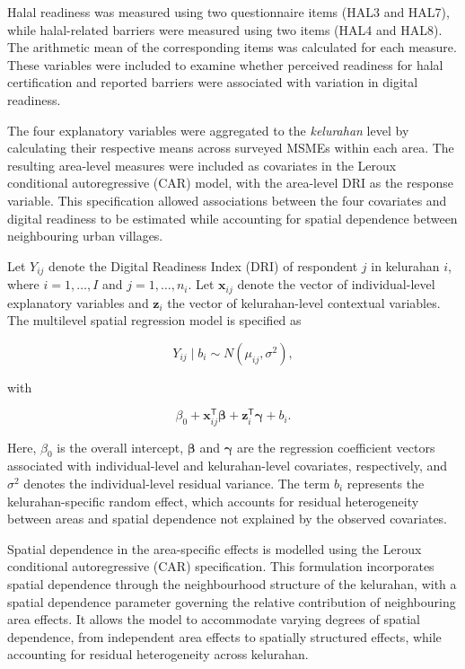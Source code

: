 \documentclass[
  default,
]{sn-jnl}
\begin{document}
Halal readiness was measured using two questionnaire items (HAL3 and
HAL7), while halal-related barriers were measured using two items (HAL4
and HAL8). The arithmetic mean of the corresponding items was calculated
for each measure. These variables were included to examine whether
perceived readiness for halal certification and reported barriers were
associated with variation in digital readiness.

The four explanatory variables were aggregated to the \emph{kelurahan}
level by calculating their respective means across surveyed MSMEs within
each area. The resulting area-level measures were included as covariates
in the Leroux conditional autoregressive (CAR) model, with the
area-level DRI as the response variable. This specification allowed
associations between the four covariates and digital readiness to be
estimated while accounting for spatial dependence between neighbouring
urban villages.

Let \(Y_{ij}\) denote the Digital Readiness Index (DRI) of respondent
\(j\) in kelurahan \(i\), where \(i=1,\ldots,I\) and \(j=1,\ldots,n_i\).
Let \(\mathbf{x}_{ij}\) denote the vector of individual-level
explanatory variables and \(\mathbf{z}_i\) the vector of kelurahan-level
contextual variables. The multilevel spatial regression model is
specified as

\[
Y_{ij}\mid b_i \sim N(\mu_{ij},\sigma^2),
\]

with

\[
\beta_0
+
\mathbf{x}_{ij}^{\mathsf T}\boldsymbol{\beta}
+
\mathbf{z}_i^{\mathsf T}\boldsymbol{\gamma}
+
b_i.
\]

Here, \(\beta_0\) is the overall intercept, \(\boldsymbol{\beta}\) and
\(\boldsymbol{\gamma}\) are the regression coefficient vectors
associated with individual-level and kelurahan-level covariates,
respectively, and \(\sigma^2\) denotes the individual-level residual
variance. The term \(b_i\) represents the kelurahan-specific random
effect, which accounts for residual heterogeneity between areas and
spatial dependence not explained by the observed covariates.

Spatial dependence in the area-specific effects is modelled using the
Leroux conditional autoregressive (CAR) specification. This formulation
incorporates spatial dependence through the neighbourhood structure of
the kelurahan, with a spatial dependence parameter governing the
relative contribution of neighbouring area effects. It allows the model
to accommodate varying degrees of spatial dependence, from independent
area effects to spatially structured effects, while accounting for
residual heterogeneity across kelurahan.
\end{document}
